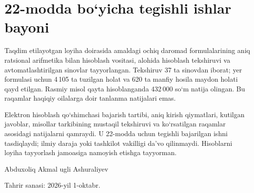 \documentclass[14pt,a4paper]{extarticle}
\begin{document}
\section*{22-modda bo‘yicha tegishli ishlar bayoni}
Taqdim etilayotgan loyiha doirasida amaldagi ochiq daromad formulalarining aniq ratsional arifmetika bilan hisoblash vositasi, alohida hisoblash tekshiruvi va avtomatlashtirilgan sinovlar tayyorlangan. Tekshiruv 37 ta sinovdan iborat; yer formulasi uchun 4\,105 ta tuzilgan holat va 620 ta manfiy hosila maydon holati qayd etilgan. Rasmiy misol qayta hisoblanganda 432\,000 so‘m natija olingan. Bu raqamlar haqiqiy oilalarga doir tanlanma natijalari emas.

Elektron hisoblash qo‘shimchasi bajarish tartibi, aniq kirish qiymatlari, kutilgan javoblar, misollar tarkibining mustaqil tekshiruvi va ko‘rsatilgan raqamlar asosidagi natijalarni qamraydi. U 22-modda uchun tegishli bajarilgan ishni tasdiqlaydi; ilmiy daraja yoki tashkilot vakilligi da’vo qilinmaydi. Hisoblarni loyiha tayyorlash jamoasiga namoyish etishga tayyorman.

Abduxoliq Akmal ugli Ashuraliyev\par
Tahrir sanasi: 2026-yil 1-oktabr.
\end{document}

